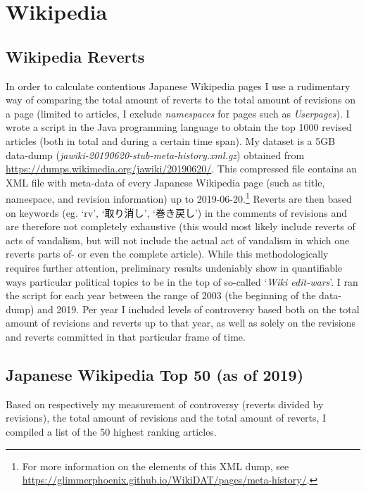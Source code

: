 \documentclass[10pt,british,A4paper,,openany]{memoir}
\begin{document}
\section{Wikipedia}\label{wikipedia}

\subsection{Wikipedia Reverts}\label{wikipedia-reverts}

In order to calculate contentious Japanese Wikipedia pages I use a
rudimentary way of comparing the total amount of reverts to the total
amount of revisions on a page (limited to articles, I exclude
\emph{namespaces} for pages such as \emph{Userpages}). I wrote a script
in the Java programming language to obtain the top 1000 revised articles
(both in total and during a certain time span). My dataset is a 5GB
data-dump (\emph{jawiki-20190620-stub-meta-history.xml.gz}) obtained
from \url{https://dumps.wikimedia.org/jawiki/20190620/}. This compressed
file contains an XML file with meta-data of every Japanese Wikipedia
page (such as title, namespace, and revision information) up to
2019-06-20.\footnote{For more information on the elements of this XML
  dump, see
  \url{https://glimmerphoenix.github.io/WikiDAT/pages/meta-history/}.}
Reverts are then based on keywords (eg. `rv', `取り消し', `巻き戻し') in
the comments of revisions and are therefore not completely exhaustive
(this would most likely include reverts of acts of vandalism, but will
not include the actual act of vandalism in which one reverts parts of-
or even the complete article). While this methodologically requires
further attention, preliminary results undeniably show in quantifiable
ways particular political topics to be in the top of so-called
`\emph{Wiki edit-wars}'. I ran the script for each year between the
range of 2003 (the beginning of the data-dump) and 2019. Per year I
included levels of controversy based both on the total amount of
revisions and reverts up to that year, as well as solely on the
revisions and reverts committed in that particular frame of time.

\subsection{Japanese Wikipedia Top 50 (as of
2019)}\label{japanese-wikipedia-top-50-as-of-2019}

\label{sec:wikiappendix}

Based on respectively my measurement of controversy (reverts divided by
revisions), the total amount of revisions and the total amount of
reverts, I compiled a list of the 50 highest ranking articles.
\end{document}
